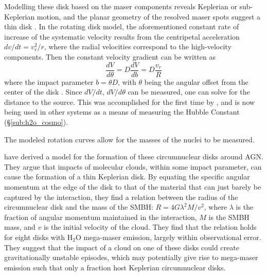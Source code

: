 Modelling these disk based on the maser components reveals Keplerian or sub-Keplerian motion, and the planar geometry of the resolved maser spots suggest a thin disk \citep{lo2005}. In the rotating disk model, the aforementioned constant rate of increase of the systematic velocity results from the centripetal acceleration $dv/dt = v_r^2/r$, where the radial velocities correspond to the high-velocity components. Then the constant velocity gradient can be written as
\begin{equation}
\label{eq:disk_rot}
\frac{dV}{d\theta} = D \frac{dV}{db} = D \frac{v_r}{R}
\end{equation}
where the impact parameter $b= \theta D$, with $\theta$ being the angular offset from the center of the disk \citep{lo2005}. Since $dV/dt$, $dV/d\theta$ can be measured, one can solve for the distance to the source. This was accomplished for the first time by \citet{Miyoshi_1994}, and is now being used in other systems as a means of measuring the Hubble Constant (\S\ref{sub:h2o_cosmo}).

The modeled rotation curves allow for the masses of the nuclei to be measured. 

\citet{wardle2012_bhmass} have derived a model for the formation of these circumnuclear disks around AGN. They argue that impacts of molecular clouds, within some impact parameter, can cause the formation of a thin Keplerian disk. By equating the specific angular momentum at the edge of the disk to that of the material that can just barely be captured by the interaction, they find a relation between the radius of the circumnuclear disk and the mass of the SMBH: $R=4G\lambda^2M/v^2$, where $\lambda$ is the fraction of angular momentum maintained in the interaction, $M$ is the SMBH mass, and $v$ is the initial velocity of the cloud. They find that the relation holds for eight disks with H$_2$O mega-maser emission, largely within observational error. They suggest that the impact of a cloud on one of these disks could create gravitationally unstable episodes, which may potentially give rise to mega-maser emission \citep{Milosavljevi_2004} such that only a fraction host Keplerian circumnuclear disks.

